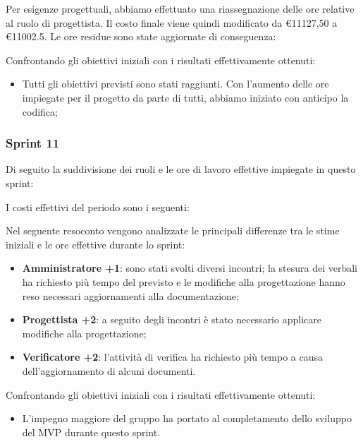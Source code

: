 Per esigenze progettuali, abbiamo effettuato una riassegnazione delle ore relative al ruolo di progettista. Il costo finale viene quindi modificato da \euro{11127,50} a \euro{11002.5}. Le ore residue sono state aggiornate di conseguenza:



Confrontando gli obiettivi iniziali con i risultati effettivamente ottenuti:
\begin{itemize}
\item Tutti gli obiettivi previsti sono stati raggiunti. Con l'aumento delle ore impiegate per il progetto da parte di tutti, abbiamo iniziato con anticipo la codifica;
\end{itemize}

\pagebreak

\subsubsection{Sprint 11}

Di seguito la suddivisione dei ruoli e le ore di lavoro effettive impiegate in questo sprint:



I costi effettivi del periodo sono i seguenti:



Nel seguente resoconto vengono analizzate le principali differenze tra le stime iniziali e le ore effettive durante lo sprint:
\begin{itemize}
    \item \textbf{Amministratore +1}: sono stati svolti diversi incontri; la stesura dei verbali ha richiesto più tempo del previsto e le modifiche alla progettazione hanno reso necessari aggiornamenti alla documentazione;
    \item \textbf{Progettista +2}: a seguito degli incontri è stato necessario applicare modifiche alla progettazione;
    \item \textbf{Verificatore +2}: l'attività di verifica ha richiesto più tempo a causa dell'aggiornamento di alcuni documenti.
\end{itemize}




Confrontando gli obiettivi iniziali con i risultati effettivamente ottenuti:
\begin{itemize}
\item L'impegno maggiore del gruppo ha portato al completamento dello sviluppo del MVP durante questo sprint.
\end{itemize}

